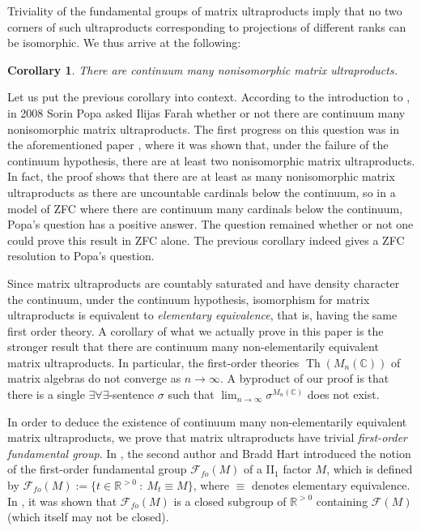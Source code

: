\documentclass[12pt]{amsart}
\numberwithin{equation}{section}
\newtheorem*{cor*}{Corollary}
\theoremstyle{definition}
\def\bb{\mathbb}
\begin{document}
Triviality of the fundamental groups of matrix ultraproducts imply that no two corners of such ultraproducts corresponding to projections of different ranks  can be isomorphic.  We thus arrive at the following:  

\begin{cor*}
There are continuum many nonisomorphic matrix ultraproducts.
\end{cor*}

Let us put the previous corollary into context.  According to the introduction to \cite{farah2014modelII}, in 2008 Sorin Popa asked Ilijas Farah whether or not there are continuum many nonisomorphic matrix ultraproducts.  The first progress on this question was in the aforementioned paper \cite{farah2014modelII}, where it was shown that, under the failure of the continuum hypothesis, there are at least two nonisomorphic matrix ultraproducts.  In fact, the proof shows that there are at least as many nonisomorphic matrix ultraproducts as there are uncountable cardinals below the continuum, so in a model of ZFC where there are continuum many cardinals below the continuum, Popa's question has a positive answer.  The question remained whether or not one could prove this result in ZFC alone.  The previous corollary indeed gives a ZFC resolution to Popa's question.

Since matrix ultraproducts are countably saturated and have density character the continuum, under the continuum hypothesis, isomorphism for matrix ultraproducts is equivalent to \emph{elementary equivalence}, that is, having the same first order theory.  A corollary of what we actually prove in this paper is the stronger result that there are continuum many non-elementarily equivalent matrix ultraproducts.  In particular, the first-order theories $\operatorname{Th}(M_n(\bb C))$ of matrix algebras do not converge as $n\to \infty$.  A byproduct of our proof is that there is a single $\exists\forall\exists$-sentence $\sigma$ such that $\lim_{n\to \infty}\sigma^{M_n(\bb C)}$ does not exist.

In order to deduce the existence of continuum many non-elementarily equivalent matrix ultraproducts, we prove that matrix ultraproducts have trivial \emph{first-order fundamental group}.  In \cite{goldbring2017theories}, the second author and Bradd Hart introduced the notion of the first-order fundamental group $\mathcal{F}_{fo}(M)$ of a II$_1$ factor $M$, which is defined by $\mathcal{F}_{fo}(M):=\{t\in \bb R^{>0} \ : \ M_t\equiv M\}$, where $\equiv$ denotes elementary equivalence.  In \cite{goldbring2017theories}, it was shown that $\mathcal{F}_{fo}(M)$ is a closed subgroup of $\bb R^{>0}$ containing $\mathcal{F}(M)$ (which itself may not be closed). 
\end{document}
